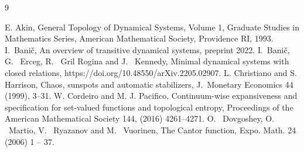 \documentclass[a4paper,12pt]{article} %
\begin{document}
\begin{thebibliography}{9}
%

 E. Akin, General Topology of Dynamical Systems, Volume 1, Graduate Studies in Mathematics Series, American Mathematical Society, Providence RI, 1993.
 I.~Bani\v{c}, An overview of transitive dynamical systems,  preprint 2022.
 I.~Bani\v{c}, G. ~Erceg, R. ~Gril Rogina and J. ~Kennedy, Minimal dynamical systems with closed relations,  
https://doi.org/10.48550/arXiv.2205.02907.
 L. Christiano and S. Harrison,  Chaos, sunspots and automatic stabilizers, J.\ Monetary Economics 44 (1999), 3--31. 
 W. Cordeiro and M. J. Pacifico, Continuum-wise expansiveness and specification for set-valued functions and topological entropy, Proceedings of the American Mathematical Society 144,  (2016) 4261--4271.
 O. ~Dovgoshey,  O. ~Martio,  V. ~Ryazanov and M. ~Vuorinen, The Cantor function, Expo. Math.  24 (2006) 1 -- 37.

 

\end{thebibliography}
\end{document}
